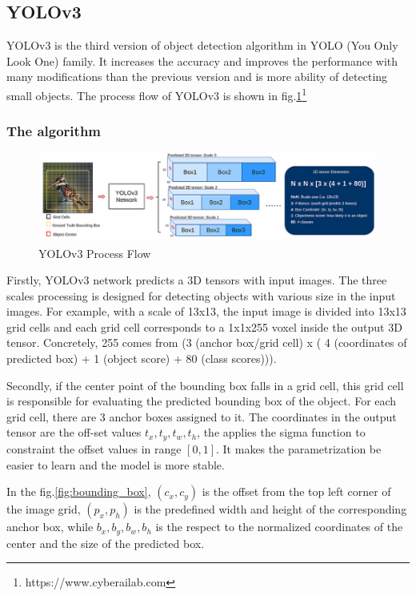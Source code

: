 \subsection{YOLOv3}
\hspace{0.45cm}YOLOv3\cite{yolov3} is the third version of object detection algorithm in YOLO (You Only Look One) family. 
It increases the accuracy and improves the performance with many modifications than the previous version and is 
more ability of detecting small objects. The process flow of YOLOv3 is shown in fig.\ref{fig:yolov3_algo}\footnote{https://www.cyberailab.com}\par
\subsubsection{The algorithm}
\begin{figure}[h!]
    \centering
    \includegraphics[width=\textwidth]{Chapters/Fig/yolo_algo.png}
    \caption{YOLOv3 Process Flow}
    \label{fig:yolov3_algo}
\end{figure}
\par
Firstly, YOLOv3\cite{yolov3} network predicts a 3D tensors with input images. The three scales processing is designed for detecting objects with various size 
in the input images. For example, with a scale of 13x13, the input image is divided into 13x13 grid cells and each grid cell corresponds to a 1x1x255 voxel inside
the output 3D tensor\cite{yolov3}. Concretely, 255 comes from (3 (anchor box/grid cell) x ( 4 (coordinates of predicted box) + 1 (object score) + 80 (class scores))).\par
Secondly, if the center point of the bounding box falls in a grid cell, this grid cell is responsible for evaluating the predicted bounding box of the object. For each grid cell, there are 3 anchor boxes assigned to it. The coordinates in the output tensor are the off-set values $t_x, t_y, t_w, t_h$, the applies the sigma function to constraint the offset values in range $[0,1]$. It makes the parametrization be easier to learn and the model is more stable\cite{Redmon_2017_CVPR}. \par
 In the fig.\ref{fig:bounding_box}\cite{Redmon_2017_CVPR}, $(c_x, c_y)$ is the offset from the top left corner of the image grid, $(p_x, p_h)$ is the predefined width and height of the corresponding anchor box, while $b_x,b_y,b_w,b_h$ is the respect to the normalized coordinates of the center and the size of the predicted box.
